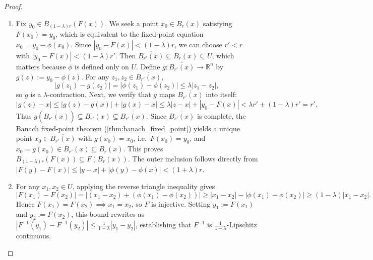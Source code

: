 \begin{proof}
\begin{enumerate}[label=\textbf{(\alph*)}]
  \item Fix $y_0 \in B_{(1-\lambda)r}(F(x))$. We seek a point $x_0 \in B_r(x)$ satisfying $F(x_0) = y_0$, which is equivalent to the fixed-point equation $x_0 = y_0 - \phi(x_0)$.
  Since $|y_0 - F(x)| < (1-\lambda)r$, we can choose $r' < r$ with $|y_0 - F(x)| < (1-\lambda)r'$. Then $\overline{B_{r'}(x)} \subseteq B_r(x) \subseteq U$, which matters because $\phi$ is defined only on $U$.
  Define $g : \overline{B_{r'}(x)} \to \mathbb{R}^n$ by $g(z) := y_0 - \phi(z)$. For any $z_1, z_2 \in \overline{B_{r'}(x)}$,
  \[
  |g(z_1) - g(z_2)| = |\phi(z_1) - \phi(z_2)| \leq \lambda |z_1 - z_2|,
  \]
  so $g$ is a $\lambda$-contraction. Next, we verify that $g$ maps $\overline{B_{r'}(x)}$ into itself:
  \[
  |g(z) - x| \leq |g(z) - g(x)| + |g(x) - x| \leq \lambda |z - x| + |y_0 - F(x)| < \lambda r' + (1-\lambda)r' = r'.
  \]
  Thus $g(\overline{B_{r'}(x)}) \subseteq B_{r'}(x) \subseteq \overline{B_{r'}(x)}$. Since $\overline{B_{r'}(x)}$ is complete, the Banach fixed-point theorem (\cref{thm:banach_fixed_point}) yields a unique point $x_0 \in \overline{B_{r'}(x)}$ with $g(x_0) = x_0$, i.e.\ $F(x_0) = y_0$, and $x_0 = g(x_0) \in B_{r'}(x) \subseteq B_r(x)$. This proves $B_{(1-\lambda)r}(F(x)) \subseteq F(B_r(x))$. The outer inclusion follows directly from $|F(y) - F(x)| \leq |y - x| + |\phi(y) - \phi(x)| < (1+\lambda)r$.

  \item For any $x_1, x_2 \in U$, applying the reverse triangle inequality gives
  \[
  |F(x_1) - F(x_2)| = |(x_1 - x_2) + (\phi(x_1) - \phi(x_2))| \geq |x_1 - x_2| - |\phi(x_1) - \phi(x_2)| \geq (1-\lambda)|x_1 - x_2|.
  \]
  Hence $F(x_1) = F(x_2) \implies x_1 = x_2$, so $F$ is injective. Setting $y_1 := F(x_1)$ and $y_2 := F(x_2)$, this bound rewrites as $|F^{-1}(y_1) - F^{-1}(y_2)| \leq \frac{1}{1-\lambda} |y_1 - y_2|$, establishing that $F^{-1}$ is $\frac{1}{1-\lambda}$-Lipschitz continuous.
\end{enumerate}
\end{proof}

